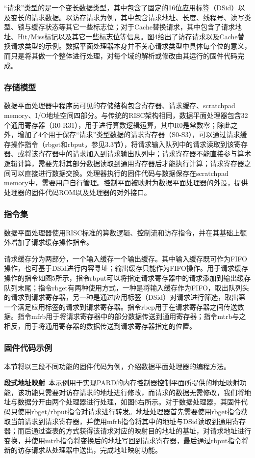 “请求”类型的是一个变长数据类型，其中包含了固定的16位应用标签（DSid）以及变长的请求数据。以访存请求为例，其中包含请求地址、长度、线程号、读写类型、锁与缓存状态等其它一些标志位；对于Cache替换请求，其中包含了请求地址、Hit/Miss标记以及其它一些标志位等信息。图4给出了访存请求以及Cache替换请求类型的示例。数据平面处理器本身并不关心请求类型中具体每个位的意义，而只是将其做一个整体进行处理，对每个域的解析或修改由其运行的固件代码完成。

\subsubsection{存储模型}
数据平面处理器中程序员可见的存储结构包含寄存器、请求缓存、scratchpad memory、I/O地址空间四部分。与传统的RISC架构相同，数据平面处理器包含32个通用寄存器（R0-R31），用于进行算数逻辑运算，其中R0是常数零；除此之外，增加了4个用于保存“请求”类型数据的请求寄存器（S0-S3），可以通过请求缓存操作指令（rbget和rbput，参见3.3节），将请求输入队列中的请求读取到该寄存器、或将该寄存器中的请求加入到请求输出队列中；请求寄存器不能直接参与算术逻辑计算，需要先将其部分数据读取到通用寄存器后才能执行计算；请求寄存器之间可以直接进行数据交换。处理器执行的固件代码与数据保存在scratchpad memory中，需要用户自行管理。控制平面被映射为数据平面处理器的外设，提供处理器的固件代码ROM以及处理器的对外接口。

\subsubsection{指令集}
数据平面处理器使用RISC标准的算数逻辑、控制流和访存指令，并在其基础上额外增加了请求缓存操作指令。

请求缓存分为两部分，一个输入缓存一个输出缓存。其中输入缓存既可作为FIFO操作，也可基于DSid进行内容寻址；输出缓存只能作为FIFO操作。用于请求缓存操作的指令如图5所示，指令rbput可以将指定请求寄存器中的请求添加到输出缓存队列末尾；指令rbget有两种使用方式，一种是将输入缓存作为FIFO，取出队列头的请求到请求寄存器，另一种是通过应用标签（DSid）对请求进行筛选，取出第一个满足应用标签的请求到请求寄存器。指令rbcp用于在请求寄存器之间传送数据。指令mfrb用于将请求寄存器中的部分数据传送到通用寄存器；指令mtrb与之相反，用于将通用寄存器的数据传送到请求寄存器指定的位置。

\subsubsection{固件代码示例}
本节将以三段不同功能的固件代码为例，介绍数据平面处理器的编程方法。

\textbf{段式地址映射}\ 本示例用于实现PARD的内存控制器控制平面所提供的地址映射功能，该功能只需要对访存请求的地址进行修改，而请求的数据无需修改，我们将地址与数据分开由两个处理器进行处理，如图6右所示。对于数据处理器，其固件代码只使用rbget/rbput指令对请求进行转发。地址处理器首先需要使用rbget指令获取当前请求到请求寄存器，并使用mfrb指令将其中的地址与DSid读取到通用寄存器；而后通过查表的方式获得该请求对应的映射目的地址的基址，对请求地址进行变换，并使用mtrb指令将变换后的地址写回到请求寄存器，最后通过rbput指令将新的访存请求从处理器中送出，完成地址映射功能。
 
